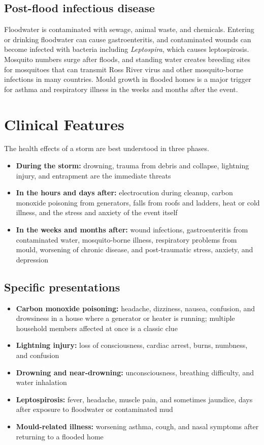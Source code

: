 \subsection*{Post-flood infectious disease}
Floodwater is contaminated with sewage, animal waste, and chemicals. Entering or drinking floodwater can cause gastroenteritis, and contaminated wounds can become infected with bacteria including \textit{Leptospira}, which causes leptospirosis. Mosquito numbers surge after floods, and standing water creates breeding sites for mosquitoes that can transmit Ross River virus and other mosquito-borne infections in many countries. Mould growth in flooded homes is a major trigger for asthma and respiratory illness in the weeks and months after the event.

\section*{Clinical Features}
The health effects of a storm are best understood in three phases.

\begin{itemize}
    \item \textbf{During the storm:} drowning, trauma from debris and collapse, lightning injury, and entrapment are the immediate threats
    \item \textbf{In the hours and days after:} electrocution during cleanup, carbon monoxide poisoning from generators, falls from roofs and ladders, heat or cold illness, and the stress and anxiety of the event itself
    \item \textbf{In the weeks and months after:} wound infections, gastroenteritis from contaminated water, mosquito-borne illness, respiratory problems from mould, worsening of chronic disease, and post-traumatic stress, anxiety, and depression
\end{itemize}

\subsection*{Specific presentations}
\begin{itemize}
    \item \textbf{Carbon monoxide poisoning:} headache, dizziness, nausea, confusion, and drowsiness in a house where a generator or heater is running; multiple household members affected at once is a classic clue
    \item \textbf{Lightning injury:} loss of consciousness, cardiac arrest, burns, numbness, and confusion
    \item \textbf{Drowning and near-drowning:} unconsciousness, breathing difficulty, and water inhalation
    \item \textbf{Leptospirosis:} fever, headache, muscle pain, and sometimes jaundice, days after exposure to floodwater or contaminated mud
    \item \textbf{Mould-related illness:} worsening asthma, cough, and nasal symptoms after returning to a flooded home
\end{itemize}

